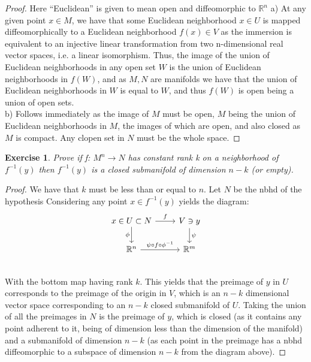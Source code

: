 \documentclass{article}
\newtheorem{exercise}{Exercise}
\begin{document}
\begin{proof} Here ``Euclidean'' is given to mean open and diffeomorphic to $\mathbb{R}^{n}$
  a) At any given point $x \in M$, we have that some Euclidean neighborhood $x \in U$ is mapped diffeomorphically to a Euclidean neighborhood $f(x) \in V$ as the immersion is equivalent to an injective linear transformation from two n-dimensional real vector spaces, i.e. a linear isomorphism. Thus, the image of the union of Euclidean neighborhoods in any open set $W$ is the union of Euclidean neighborhoods in $f(W)$, and as $M, N$ are manifolds we have that the union of Euclidean neighborhoods in $W$ is equal to $W$, and thus $f(W)$ is open being a union of open sets. \\
  b) Follows immediately as the image of $M$ must be open, $M$ being the union of Euclidean neighborhoods in $M$, the images of which are open, and also closed as $M$ is compact. Any clopen set in $N$ must be the whole space.
\end{proof}

\begin{exercise}
  Prove if f: $M^{n} \to N$ has constant rank k on a neighborhood of $f^{-1}(y)$ then $f^{-1}(y)$ is a closed submanifold of dimension $n - k$ (or empty). 
\end{exercise}

\begin{proof}
  We have that $k$ must be less than or equal to $n$. Let $N$ be the nbhd of the hypothesis Considering any point $x \in f^{-1}(y)$ yields the diagram:
  \[
    \begin{tikzcd}
      x \in U \subset N \arrow{r}{f} \arrow[swap]{d}{\phi} & V \ni y \arrow{d}{\psi}\\
      \mathbb{R}^{n} \arrow{r}{\psi \circ f \circ \phi^{-1}} & \mathbb{R}^{m} \\
    \end{tikzcd}
  \]
  With the bottom map having rank $k$. This yields that the preimage of $y$ in $U$ corresponds to the preimage of the origin in $V$, which is an $n - k$ dimensional vector space corresponding to an $n - k$ closed submanifold of $U$. Taking the union of all the preimages in $N$ is the preimage of $y$, which is closed (as it contains any point adherent to it, being of dimension less than the dimension of the manifold) and a submanifold of dimension $n - k$ (as each point in the preimage has a nbhd diffeomorphic to a subspace of dimension $n - k$ from the diagram above). 
\end{proof}
\end{document}
